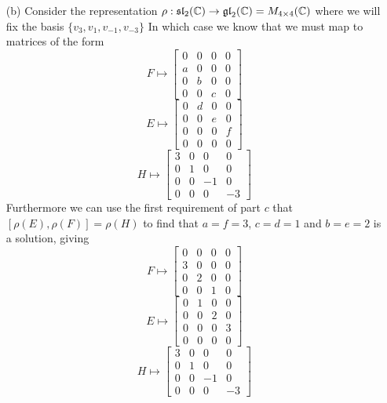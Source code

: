 \documentclass[12pt]{amsart}
\begin{document}
\begin{itemize}
\begin{itemize}
        \item[(b)] %
        Consider the representation $\rho:\mathfrak{sl}_2(\mathbb{C})\rightarrow\mathfrak{gl}_2(\mathbb{C})=M_{4\times 4}(\mathbb{C})$ 
        where we will fix the basis $\{v_3,v_1,v_{-1},v_{-3}\}$ In which case we know that we must map to matrices of the form
        \[F\mapsto\begin{bmatrix}
            0&0&0&0\\
            a&0&0&0\\
            0&b&0&0\\
            0&0&c&0
        \end{bmatrix}\]
        \[E\mapsto\begin{bmatrix}
            0&d&0&0\\
            0&0&e&0\\
            0&0&0&f\\
            0&0&0&0
        \end{bmatrix}\]
        \[H\mapsto\begin{bmatrix}
            3&0&0&0\\
            0&1&0&0\\
            0&0&-1&0\\
            0&0&0&-3
        \end{bmatrix}\]
        Furthermore we can use the first requirement of part $c$ that $[\rho(E),\rho(F)]=\rho(H)$ to find that $a=f=3$, $c=d=1$ and $b=e=2$ is a solution, giving
        \[F\mapsto\begin{bmatrix}
            0&0&0&0\\
            3&0&0&0\\
            0&2&0&0\\
            0&0&1&0
        \end{bmatrix}\]
        \[E\mapsto\begin{bmatrix}
            0&1&0&0\\
            0&0&2&0\\
            0&0&0&3\\
            0&0&0&0
        \end{bmatrix}\]
        \[H\mapsto\begin{bmatrix}
            3&0&0&0\\
            0&1&0&0\\
            0&0&-1&0\\
            0&0&0&-3
        \end{bmatrix}\]
        

\end{itemize}
\end{itemize}
\end{document}
